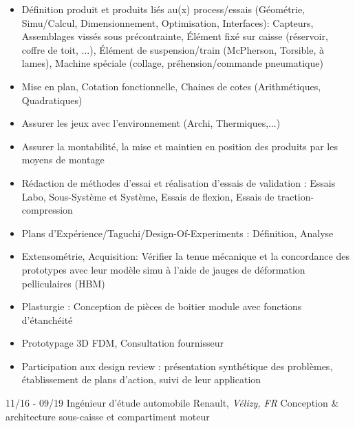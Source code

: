 \documentclass[]{friggeri-cv}
\begin{document}
\vspace{0.5mm}
\begin{itemize}
\setlength{\itemsep}{1pt}
\setlength{\parskip}{0pt}
\setlength{\parsep}{0pt}

\item Définition produit et produits liés au(x) process/essais (Géométrie, Simu/Calcul, Dimensionnement, Optimisation, Interfaces): Capteurs, Assemblages vissés sous précontrainte, Élément fixé sur caisse (réservoir, coffre de toit, ...), Élément de suspension/train (McPherson, Torsible, à lames), Machine spéciale (collage, préhension/commande pneumatique)
\item Mise en plan, Cotation fonctionnelle, Chaines de cotes (Arithmétiques, Quadratiques)
\item Assurer les jeux avec l'environnement (Archi, Thermiques,...)
\item Assurer la montabilité, la mise et maintien en position des produits par les moyens de montage
\item Rédaction de méthodes d’essai et réalisation d’essais de validation : Essais Labo, Sous-Système et Système, Essais de flexion, Essais de traction-compression
\item Plans d’Expérience/Taguchi/Design-Of-Experiments : Définition, Analyse
\item Extensométrie, Acquisition: Vérifier la tenue mécanique et la concordance des prototypes avec leur modèle simu à l’aide de jauges de déformation pelliculaires (HBM)
\item Plasturgie : Conception de pièces de boitier module avec fonctions d’étanchéité
\item Prototypage 3D FDM, Consultation fournisseur
\item Participation aux design review : présentation synthétique des problèmes, établissement de plans d’action, suivi de leur application
\end{itemize}

\begin{entrylist}
  \entry
    {11/16 - 09/19}
    {Ingénieur d'étude automobile}
    {Renault, \textit{Vélizy, FR}}
    {Conception \& architecture sous-caisse et compartiment moteur}
\end{entrylist}
\vspace{-15pt}
\end{document}
